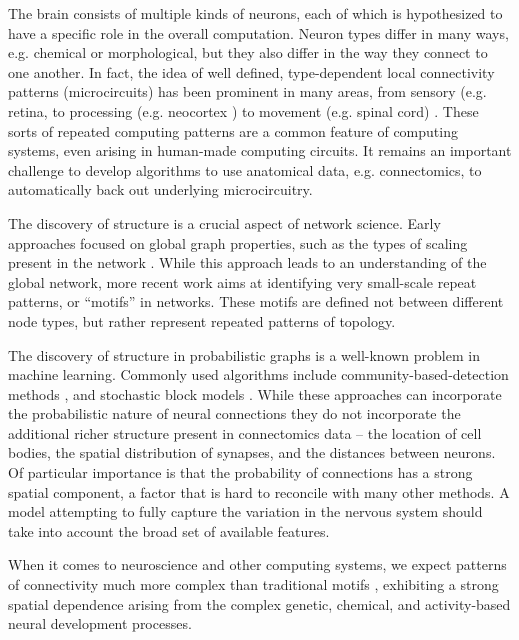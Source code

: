 \documentclass{article}
\begin{document}
The brain consists of multiple kinds of neurons, each of which is
hypothesized to have a specific role in the overall
computation. Neuron types differ in many ways, e.g. chemical or
morphological, but they also differ in the way they connect to one
another. In fact, the idea of well defined, type-dependent local
connectivity patterns (microcircuits) has been prominent in many
areas, from sensory (e.g. retina, \autocite{Masland2001} to processing
(e.g. neocortex \autocite{Mountcastle1997}) to movement (e.g. spinal
cord) \autocite{Grillner2005}. These sorts of repeated computing
patterns are a common feature of computing systems, even arising in
human-made computing circuits. It remains an important challenge to
develop algorithms to use anatomical data, e.g. connectomics, to
automatically back out underlying microcircuitry.

The discovery of structure is a crucial aspect of network
science. Early approaches focused on global graph properties, such as
the types of scaling present in the network \autocite
{WattsStrogatz1998}.  While this approach leads to an understanding
of the global network, more recent work aims at identifying very small-scale
repeat patterns, or “motifs” in networks\autocite{Milo2002}. These motifs
are defined not between different node types, but rather represent repeated
patterns of topology. 

The discovery of structure in probabilistic graphs is a well-known
problem in machine learning. Commonly used algorithms include
community-based-detection methods \autocite{Girvan2002}, and
stochastic block models \autocite{Nowicki2001}.  While these
approaches can incorporate the probabilistic nature of neural
connections \autocite{Hill2012} they do not incorporate the additional
richer structure present in connectomics data -- the location of cell
bodies, the spatial distribution of synapses, and the distances
between neurons. Of particular importance is that the probability of
connections has a strong spatial component, a factor that is hard to
reconcile with many other methods. A model attempting to fully capture
the variation in the nervous system should take into account the broad
set of available features.

When it comes to neuroscience and other computing systems, we expect
patterns of connectivity much more complex than traditional motifs ,
exhibiting a strong spatial dependence arising from the complex
genetic, chemical, and activity-based neural development processes.
\end{document}
